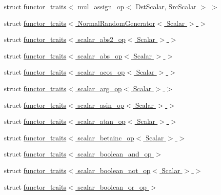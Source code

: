 \begin{DoxyCompactItemize}
\item 
struct \hyperlink{struct_eigen_1_1internal_1_1functor__traits_3_01mul__assign__op_3_01_dst_scalar_00_01_src_scalar_01_4_01_4}{functor\+\_\+traits$<$ mul\+\_\+assign\+\_\+op$<$ Dst\+Scalar, Src\+Scalar $>$ $>$}
\item 
struct \hyperlink{struct_eigen_1_1internal_1_1functor__traits_3_01_normal_random_generator_3_01_scalar_01_4_01_4}{functor\+\_\+traits$<$ Normal\+Random\+Generator$<$ Scalar $>$ $>$}
\item 
struct \hyperlink{struct_eigen_1_1internal_1_1functor__traits_3_01scalar__abs2__op_3_01_scalar_01_4_01_4}{functor\+\_\+traits$<$ scalar\+\_\+abs2\+\_\+op$<$ Scalar $>$ $>$}
\item 
struct \hyperlink{struct_eigen_1_1internal_1_1functor__traits_3_01scalar__abs__op_3_01_scalar_01_4_01_4}{functor\+\_\+traits$<$ scalar\+\_\+abs\+\_\+op$<$ Scalar $>$ $>$}
\item 
struct \hyperlink{struct_eigen_1_1internal_1_1functor__traits_3_01scalar__acos__op_3_01_scalar_01_4_01_4}{functor\+\_\+traits$<$ scalar\+\_\+acos\+\_\+op$<$ Scalar $>$ $>$}
\item 
struct \hyperlink{struct_eigen_1_1internal_1_1functor__traits_3_01scalar__arg__op_3_01_scalar_01_4_01_4}{functor\+\_\+traits$<$ scalar\+\_\+arg\+\_\+op$<$ Scalar $>$ $>$}
\item 
struct \hyperlink{struct_eigen_1_1internal_1_1functor__traits_3_01scalar__asin__op_3_01_scalar_01_4_01_4}{functor\+\_\+traits$<$ scalar\+\_\+asin\+\_\+op$<$ Scalar $>$ $>$}
\item 
struct \hyperlink{struct_eigen_1_1internal_1_1functor__traits_3_01scalar__atan__op_3_01_scalar_01_4_01_4}{functor\+\_\+traits$<$ scalar\+\_\+atan\+\_\+op$<$ Scalar $>$ $>$}
\item 
struct \hyperlink{struct_eigen_1_1internal_1_1functor__traits_3_01scalar__betainc__op_3_01_scalar_01_4_01_4}{functor\+\_\+traits$<$ scalar\+\_\+betainc\+\_\+op$<$ Scalar $>$ $>$}
\item 
struct \hyperlink{struct_eigen_1_1internal_1_1functor__traits_3_01scalar__boolean__and__op_01_4}{functor\+\_\+traits$<$ scalar\+\_\+boolean\+\_\+and\+\_\+op $>$}
\item 
struct \hyperlink{struct_eigen_1_1internal_1_1functor__traits_3_01scalar__boolean__not__op_3_01_scalar_01_4_01_4}{functor\+\_\+traits$<$ scalar\+\_\+boolean\+\_\+not\+\_\+op$<$ Scalar $>$ $>$}
\item 
struct \hyperlink{struct_eigen_1_1internal_1_1functor__traits_3_01scalar__boolean__or__op_01_4}{functor\+\_\+traits$<$ scalar\+\_\+boolean\+\_\+or\+\_\+op $>$}

\end{DoxyCompactItemize}
